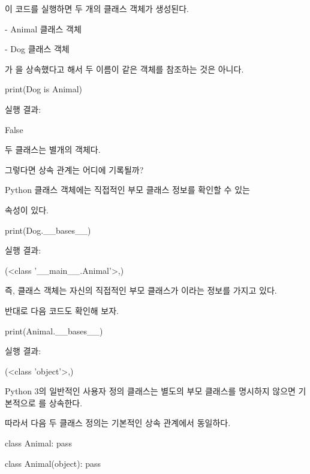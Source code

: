 이 코드를 실행하면 두 개의 클래스 객체가 생성된다.

\begin{dhksmry}
    - Animal 클래스 객체

    - Dog 클래스 객체
\end{dhksmry}

가 을 상속했다고 해서 두 이름이 같은 객체를 참조하는 것은 아니다.

\begin{dhkcode}
print(Dog is Animal)
\end{dhkcode}

실행 결과:

\begin{dhkzsh}
False
\end{dhkzsh}

두 클래스는 별개의 객체다.

그렇다면 상속 관계는 어디에 기록될까?

Python 클래스 객체에는 직접적인 부모 클래스 정보를 확인할 수 있는 

 속성이 있다.

\begin{dhkcode}
print(Dog.__bases__)
\end{dhkcode}

실행 결과:

\begin{dhkzsh}
(<class '__main__.Animal'>,)
\end{dhkzsh}

즉,  클래스 객체는 자신의 직접적인 부모 클래스가 이라는 정보를 가지고 있다.

반대로 다음 코드도 확인해 보자.

\begin{dhkcode}
print(Animal.__bases__)
\end{dhkcode}

실행 결과:

\begin{dhkzsh}
(<class 'object'>,)
\end{dhkzsh}

Python 3의 일반적인 사용자 정의 클래스는 별도의 부모 클래스를 명시하지 않으면 기본적으로 를 상속한다.

따라서 다음 두 클래스 정의는 기본적인 상속 관계에서 동일하다.

\begin{dhkcode}
class Animal:
    pass


class Animal(object):
    pass
\end{dhkcode}

